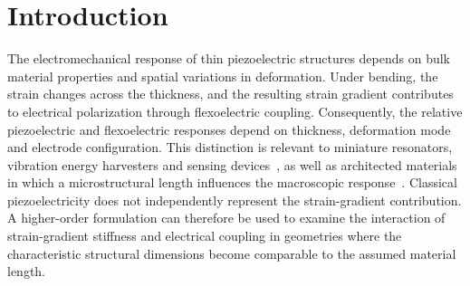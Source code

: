 \FloatBarrier
\section{Introduction}
\label{sec:intro}

The electromechanical response of thin piezoelectric structures depends on
bulk material properties and spatial variations in deformation. Under bending, the strain changes across the thickness, and the
resulting strain gradient contributes to electrical polarization through
flexoelectric coupling. Consequently, the relative piezoelectric and
flexoelectric responses depend on thickness, deformation mode and electrode
configuration. This distinction is relevant to miniature resonators, vibration
energy harvesters and sensing devices~\cite{ErturkInman2011}, as
well as architected materials in which a microstructural length influences the
macroscopic response~\cite{Jiao2023}. Classical piezoelectricity does
not independently represent the strain-gradient contribution. A higher-order
formulation can therefore be used to examine the interaction of strain-gradient
stiffness and electrical coupling in geometries where the characteristic
structural dimensions become comparable to the assumed material length.

